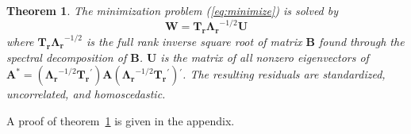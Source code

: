\documentclass[11pt]{article} %
\newtheorem{theorem}{Theorem}
\newcommand{\trans}{\ensuremath{^\prime}}
\newcommand{\var}{\ensuremath{\mathrm{Var}}}
\begin{document}
\begin{theorem}\label{thm1}
The minimization problem (\ref{eq:minimize}) is solved by
\[
\bm{W} = \bm{T_r \Lambda_r}^{-1/2} \bm{U} 
\]
where $\bm{T_r \Lambda_r}^{-1/2}$ is the full rank inverse square root of matrix $\bm{B}$ found through the spectral decomposition of $\bm{B}$. $\bm{U}$ is the matrix of all nonzero eigenvectors of $ \bm{A^*} = (\bm{\Lambda_r}^{-1/2} \bm{T_r}\trans) \bm{A} (\bm{\Lambda_r}^{-1/2} \bm{T_r}\trans)\trans$. The resulting residuals are standardized, uncorrelated, and homoscedastic.
%


\end{theorem}
A proof of theorem~\ref{thm1} is given in the appendix.
\end{document}
